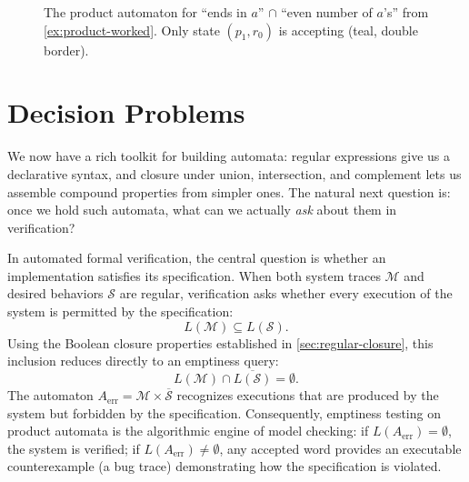 \begin{figure}[ht]
\centering
{}
\caption{The product automaton for ``ends in $a$'' $\cap$ ``even number
of $a$'s'' from \cref{ex:product-worked}.  Only state
$(p_1,r_0)$ is accepting (teal, double border).}
\label{fig:product-worked}
\end{figure}


\section{Decision Problems}
\label{sec:finite-decision-problems}

We now have a rich toolkit for building automata: regular expressions
give us a declarative syntax, and closure under union, intersection, and complement
lets us assemble compound properties from simpler ones.  The natural
next question is: once we hold such automata, what can we actually
\emph{ask} about them in verification?

In automated formal verification, the central question is whether an implementation satisfies its specification. When both system traces $\mathcal{M}$ and desired behaviors $\mathcal{S}$ are regular, verification asks whether every execution of the system is permitted by the specification:
\[
  L(\mathcal{M}) \subseteq L(\mathcal{S}).
\]
Using the Boolean closure properties established in \cref{sec:regular-closure}, this inclusion reduces directly to an emptiness query:
\[
  L(\mathcal{M}) \cap \overline{L(\mathcal{S})} = \emptyset.
\]
The automaton $A_{\mathrm{err}} = \mathcal{M} \times \overline{\mathcal{S}}$ recognizes executions that are produced by the system but forbidden by the specification. Consequently, emptiness testing on product automata is the algorithmic engine of model checking: if $L(A_{\mathrm{err}}) = \emptyset$, the system is verified; if $L(A_{\mathrm{err}}) \neq \emptyset$, any accepted word provides an executable counterexample (a bug trace) demonstrating how the specification is violated.

